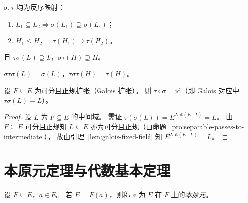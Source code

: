 \documentclass[lang=cn,a4paper,newtx]{elegantbook}
\begin{document}
\begin{proposition}
  $\sigma,\tau$ 均为反序映射：
  \begin{enumerate}
    \item $L_1\subseteq L_2\Rightarrow\sigma(L_1)\supseteq\sigma(L_2)$；
    \item $H_1\le H_2\Rightarrow\tau(H_1)\supseteq\tau(H_2)$。
  \end{enumerate}
  且 $\tau\sigma(L)\supseteq L$，$\sigma\tau(H)\supseteq H$。
\end{proposition}

\begin{remark}
  $\sigma\tau\sigma(L)=\sigma(L)$，$\tau\sigma\tau(H)=\tau(H)$。
\end{remark}

\begin{theorem}
  设 $F\subseteq E$ 为可分且正规扩张（Galois 扩张）。
  则 $\tau\circ\sigma=\mathrm{id}$（即 Galois 对应中 $\tau\sigma(L)=L$）。
\end{theorem}

\begin{proof}
  设 $L$ 为 $F\subseteq E$ 的中间域。
  需证 $\tau(\sigma(L))=E^{\mathrm{Aut}(E\mid L)}=L$。
  由 $F\subseteq E$ 可分且正规知 $L\subseteq E$ 亦为可分且正规（由命题~\ref{pro:separable-passes-to-intermediate}），
  故由引理~\ref{lem:galois-fixed-field} 知 $E^{\mathrm{Aut}(E\mid L)}=L$。
\end{proof}

\section{本原元定理与代数基本定理}

\begin{definition}[本原元]
  设 $F\subseteq E$，$a\in E$。
  若 $E=F(a)$，则称 $a$ 为 $E$ 在 $F$ 上的\emph{本原元}。
\end{definition}
\end{document}
